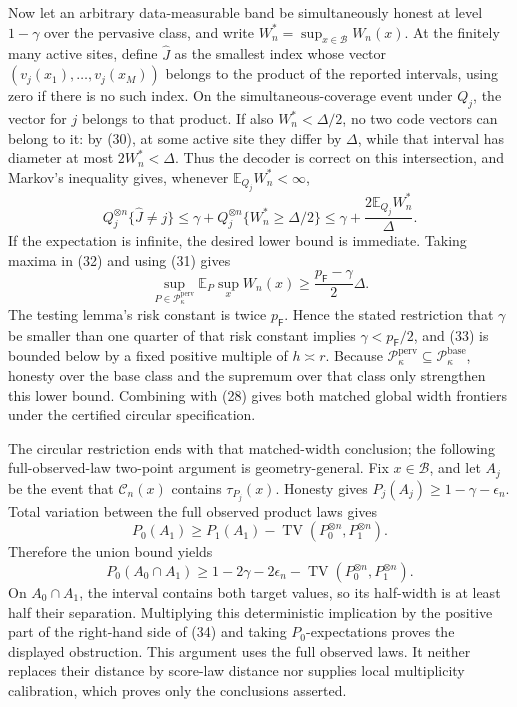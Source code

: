 Now let an arbitrary data-measurable band be simultaneously honest at level \(1-\gamma\) over the pervasive class, and write \(W_n^*=\sup_{x\in\mathcal B}W_n(x)\). At the finitely many active sites, define \(\widehat J\) as the smallest index whose vector \((v_j(x_1),\ldots,v_j(x_M))\) belongs to the product of the reported intervals, using zero if there is no such index. On the simultaneous-coverage event under \(Q_j\), the vector for \(j\) belongs to that product. If also \(W_n^*<\Delta/2\), no two code vectors can belong to it: by (30), at some active site they differ by \(\Delta\), while that interval has diameter at most \(2W_n^*<\Delta\). Thus the decoder is correct on this intersection, and Markov's inequality gives, whenever \(\mathbb E_{Q_j}W_n^*<\infty\),
\[
 Q_j^{\otimes n}\{\widehat J\ne j\}
 \le \gamma+Q_j^{\otimes n}\{W_n^*\ge\Delta/2\}
 \le \gamma+\frac{2\mathbb E_{Q_j}W_n^*}{\Delta}. \tag{32}
\]
If the expectation is infinite, the desired lower bound is immediate. Taking maxima in (32) and using (31) gives
\[
 \sup_{P\in\mathcal P_{\kappa}^{\mathrm{perv}}}
 \mathbb E_P\sup_xW_n(x)
 \ge \frac{p_{\mathsf F}-\gamma}{2}\Delta. \tag{33}
\]
The testing lemma's risk constant is twice \(p_{\mathsf F}\). Hence the stated restriction that \(\gamma\) be smaller than one quarter of that risk constant implies \(\gamma<p_{\mathsf F}/2\), and (33) is bounded below by a fixed positive multiple of \(h\asymp r\). Because \(\mathcal P_{\kappa}^{\mathrm{perv}}\subseteq\mathcal P_{\kappa}^{\mathrm{base}}\), honesty over the base class and the supremum over that class only strengthen this lower bound. Combining with (28) gives both matched global width frontiers under the certified circular specification.

The circular restriction ends with that matched-width conclusion; the following full-observed-law two-point argument is geometry-general. Fix \(x\in\mathcal B\), and let \(A_j\) be the event that \(\mathcal C_n(x)\) contains \(\tau_{P_j}(x)\). Honesty gives \(P_j(A_j)\ge1-\gamma-\epsilon_n\). Total variation between the full observed product laws gives
\[
 P_0(A_1)\ge P_1(A_1)-\operatorname{TV}(P_0^{\otimes n},P_1^{\otimes n}).
\]
Therefore the union bound yields
\[
 P_0(A_0\cap A_1)\ge1-2\gamma-2\epsilon_n-
 \operatorname{TV}(P_0^{\otimes n},P_1^{\otimes n}). \tag{34}
\]
On \(A_0\cap A_1\), the interval contains both target values, so its half-width is at least half their separation. Multiplying this deterministic implication by the positive part of the right-hand side of (34) and taking \(P_0\)-expectations proves the displayed obstruction. This argument uses the full observed laws. It neither replaces their distance by score-law distance nor supplies local multiplicity calibration, which proves only the conclusions asserted.